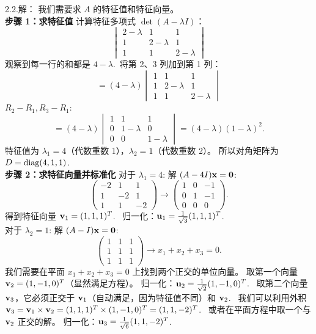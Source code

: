 \begin{exer}
2.2.解：
我们需要求 $A$ 的特征值和特征向量。\\
\textbf{步骤 1：求特征值}
计算特征多项式 $\det(A - \lambda I)$：
$$
\begin{vmatrix} 2-\lambda & 1 & 1 \\ 1 & 2-\lambda & 1 \\ 1 & 1 & 2-\lambda \end{vmatrix}
$$
观察到每一行的和都是 $4-\lambda$.~将第 2、3 列加到第 1 列：
$$
= (4-\lambda) \begin{vmatrix} 1 & 1 & 1 \\ 1 & 2-\lambda & 1 \\ 1 & 1 & 2-\lambda \end{vmatrix}
$$
$R_2 - R_1, R_3 - R_1$:
$$
= (4-\lambda) \begin{vmatrix} 1 & 1 & 1 \\ 0 & 1-\lambda & 0 \\ 0 & 0 & 1-\lambda \end{vmatrix} = (4-\lambda)(1-\lambda)^2.
$$
特征值为 $\lambda_1 = 4$（代数重数 1），$\lambda_2 = 1$（代数重数 2）。
所以对角矩阵为 $D = \operatorname{diag}(4, 1, 1)$.~
\\
\textbf{步骤 2：求特征向量并标准化}
对于 $\lambda_1 = 4$:
解 $(A - 4I)\mathbf{x} = \mathbf{0}$:
$$ \begin{pmatrix} -2 & 1 & 1 \\ 1 & -2 & 1 \\ 1 & 1 & -2 \end{pmatrix} \to \begin{pmatrix} 1 & 0 & -1 \\ 0 & 1 & -1 \\ 0 & 0 & 0 \end{pmatrix}. $$
得到特征向量 $\mathbf{v}_1 = (1, 1, 1)^T$.~
归一化：$\mathbf{u}_1 = \frac{1}{\sqrt{3}} (1, 1, 1)^T$.~
\\
对于 $\lambda_2 = 1$:
解 $(A - I)\mathbf{x} = \mathbf{0}$:
$$ \begin{pmatrix} 1 & 1 & 1 \\ 1 & 1 & 1 \\ 1 & 1 & 1 \end{pmatrix} \to x_1 + x_2 + x_3 = 0. $$
我们需要在平面 $x_1 + x_2 + x_3 = 0$ 上找到两个正交的单位向量。
取第一个向量 $\mathbf{v}_2 = (1, -1, 0)^T$（显然满足方程）。
归一化：$\mathbf{u}_2 = \frac{1}{\sqrt{2}} (1, -1, 0)^T$.~
取第二个向量 $\mathbf{v}_3$，它必须正交于 $\mathbf{v}_1$（自动满足，因为特征值不同）和 $\mathbf{v}_2$.~
我们可以利用外积 $\mathbf{v}_3 = \mathbf{v}_1 \times \mathbf{v}_2 = (1, 1, 1)^T \times (1, -1, 0)^T = (1, 1, -2)^T$.~
或者在平面方程中取一个与 $\mathbf{v}_2$ 正交的解。
归一化：$\mathbf{u}_3 = \frac{1}{\sqrt{6}} (1, 1, -2)^T$.~

\end{exer}

